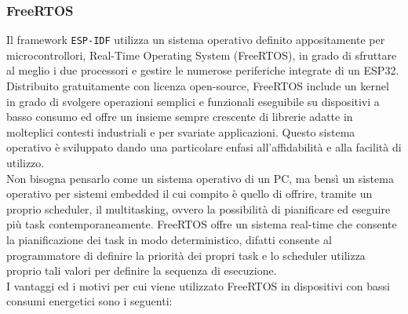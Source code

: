 \subsubsection{FreeRTOS}
Il framework \texttt{ESP-IDF} utilizza un sistema operativo definito appositamente per microcontrollori, Real-Time Operating System (FreeRTOS), in grado di sfruttare al meglio i due processori e gestire le numerose periferiche integrate di un ESP32. Distribuito gratuitamente con licenza open-source, FreeRTOS include un kernel in grado di svolgere operazioni semplici e funzionali eseguibile su dispositivi a basso consumo ed offre un insieme sempre crescente di librerie adatte in molteplici contesti industriali e per svariate applicazioni. Questo sistema operativo è sviluppato dando una particolare enfasi all'affidabilità e alla facilità di utilizzo.\\
Non bisogna pensarlo come un sistema operativo di un PC, ma bensì un sistema operativo per sistemi embedded il cui compito è quello di offrire, tramite un proprio scheduler, il multitasking, ovvero la possibilità di pianificare ed eseguire più task contemporaneamente.
FreeRTOS offre un sistema real-time che consente la pianificazione dei task in modo deterministico, difatti consente al programmatore di definire la priorità dei propri task e lo scheduler utilizza proprio tali valori per definire la sequenza di esecuzione.\\
I vantaggi ed i motivi per cui viene utilizzato FreeRTOS in dispositivi con bassi consumi energetici sono i seguenti:

